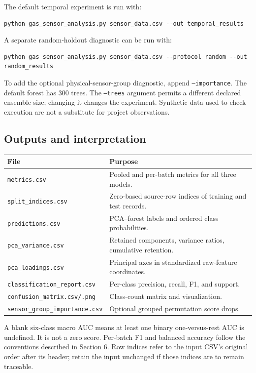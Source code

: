 \documentclass[11pt,a4paper]{article}
\begin{document}
The default temporal experiment is run with:
\begin{lstlisting}[language={}]
python gas_sensor_analysis.py sensor_data.csv --out temporal_results
\end{lstlisting}
A separate random-holdout diagnostic can be run with:
\begin{lstlisting}[language={}]
python gas_sensor_analysis.py sensor_data.csv --protocol random --out random_results
\end{lstlisting}
To add the optional physical-sensor-group diagnostic, append \texttt{--importance}. The default forest has 300 trees. The \texttt{--trees} argument permits a different declared ensemble size; changing it changes the experiment. Synthetic data used to check execution are not a substitute for project observations.

\subsection{Outputs and interpretation}
\begin{tabularx}{\textwidth}{@{}lX@{}}\toprule
File & Purpose\\\midrule
\texttt{metrics.csv} & Pooled and per-batch metrics for all three models.\\
\texttt{split\_indices.csv} & Zero-based source-row indices of training and test records.\\
\texttt{predictions.csv} & PCA--forest labels and ordered class probabilities.\\
\texttt{pca\_variance.csv} & Retained components, variance ratios, cumulative retention.\\
\texttt{pca\_loadings.csv} & Principal axes in standardized raw-feature coordinates.\\
\texttt{classification\_report.csv} & Per-class precision, recall, F1, and support.\\
\texttt{confusion\_matrix.csv/.png} & Class-count matrix and visualization.\\
\texttt{sensor\_group\_importance.csv} & Optional grouped permutation score drops.\\\bottomrule
\end{tabularx}

A blank six-class macro AUC means at least one binary one-versus-rest AUC is undefined. It is not a zero score. Per-batch F1 and balanced accuracy follow the conventions described in Section 6. Row indices refer to the input CSV's original order after its header; retain the input unchanged if those indices are to remain traceable.
\end{document}
